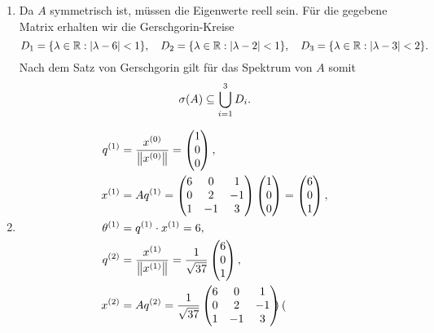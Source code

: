 \documentclass{exercise}
\begin{document}
	\begin{enumerate}
		\item Da \(A\) symmetrisch ist, müssen die Eigenwerte reell sein.
		Für die gegebene Matrix erhalten wir die Gerschgorin-Kreise
		\[
			D_1 = \braces*{\lambda \in \R : \absolute*{\lambda - 6} < 1}, \quad D_2 = \braces*{\lambda \in \R : \absolute*{\lambda - 2} < 1}, \quad D_3 = \braces*{\lambda \in \R : \absolute*{\lambda - 3} < 2}.
		\]
		Nach dem Satz von Gerschgorin gilt für das Spektrum von \(A\) somit
		\[
			\sigma\parentheses*{A} \subseteq \bigcup_{i = 1}^3 D_i.
		\]
		\item
		\begin{align*}
			q^{\parentheses*{1}} &= \frac{x^{\parentheses*{0}}}{\norm*{x^{\parentheses*{0}}}} = \begin{pmatrix}
				1\\
				0\\
				0
			\end{pmatrix},\\
			x^{\parentheses*{1}} &= Aq^{\parentheses*{1}} = \begin{pmatrix}
				6 & 0 & 1\\
				0 & 2 & -1\\
				1 & -1 & 3
			\end{pmatrix}\begin{pmatrix}
				1\\
				0\\
				0
			\end{pmatrix} = \begin{pmatrix}
				6\\
				0\\
				1
			\end{pmatrix},\\
			\theta^{\parentheses*{1}} &= q^{\parentheses*{1}} \cdot x^{\parentheses*{1}} = 6,\\
			q^{\parentheses*{2}} &= \frac{x^{\parentheses*{1}}}{\norm*{x^{\parentheses*{1}}}} = \frac{1}{\sqrt{37}}\begin{pmatrix}
				6\\
				0\\
				1
			\end{pmatrix},\\
			x^{\parentheses*{2}} &= Aq^{\parentheses*{2}} = \frac{1}{\sqrt{37}}\begin{pmatrix}
				6 & 0 & 1\\
				0 & 2 & -1\\
				1 & -1 & 3
			\end{pmatrix}\begin{pmatrix}

\end{pmatrix}
\end{align*}
\end{enumerate}
\end{document}
